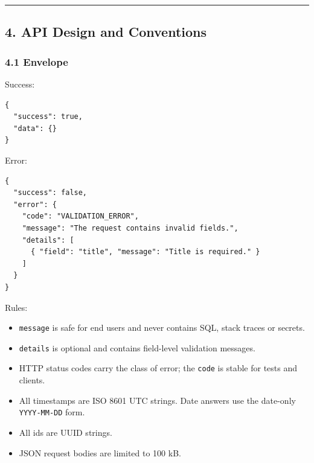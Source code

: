 \documentclass[12pt,a4paper]{article}
\begin{document}
\medskip\noindent\rule{\linewidth}{0.4pt}\medskip

\subsection*{4. API Design and Conventions}
\subsubsection*{4.1 Envelope}
Success:

\begin{lstlisting}
{
  "success": true,
  "data": {}
}
\end{lstlisting}

Error:

\begin{lstlisting}
{
  "success": false,
  "error": {
    "code": "VALIDATION_ERROR",
    "message": "The request contains invalid fields.",
    "details": [
      { "field": "title", "message": "Title is required." }
    ]
  }
}
\end{lstlisting}

Rules:

\begin{itemize}[leftmargin=*]
\item \texttt{message} is safe for end users and never contains SQL, stack traces or secrets.
\item \texttt{details} is optional and contains field-level validation messages.
\item HTTP status codes carry the class of error; the \texttt{code} is stable for tests and clients.
\item All timestamps are ISO 8601 UTC strings. Date answers use the date-only \texttt{YYYY-MM-DD} form.
\item All ids are UUID strings.
\item JSON request bodies are limited to 100 kB.
\end{itemize}

\end{document}
